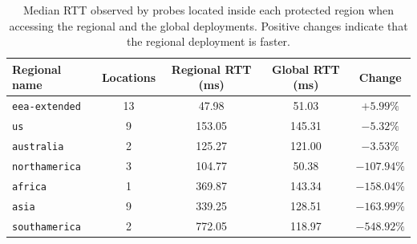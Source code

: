 \begin{table}[ht]
    \centering
    \small
    \caption{Median RTT observed by probes located inside each protected region when accessing the regional and the global deployments. Positive changes indicate that the regional deployment is faster.}
    \label{tab:rcadns_median_rtt}
    \begin{tabular}{lcccc}
        \toprule
        \textbf{Regional name} & \textbf{Locations} & \textbf{Regional RTT (ms)} & \textbf{Global RTT (ms)} & \textbf{Change} \\
        \midrule
        \texttt{eea-extended} & 13 & 47.98  & 51.03  & $+5.99\%$ \\
        \texttt{us}           &  9 & 153.05 & 145.31 & $-5.32\%$ \\
        \texttt{australia}    &  2 & 125.27 & 121.00 & $-3.53\%$ \\
        \texttt{northamerica} &  3 & 104.77 & 50.38  & $-107.94\%$ \\
        \texttt{africa}       &  1 & 369.87 & 143.34 & $-158.04\%$ \\
        \texttt{asia}         &  9 & 339.25 & 128.51 & $-163.99\%$ \\
        \texttt{southamerica} &  2 & 772.05 & 118.97 & $-548.92\%$ \\
        \bottomrule
    \end{tabular}
\end{table}

